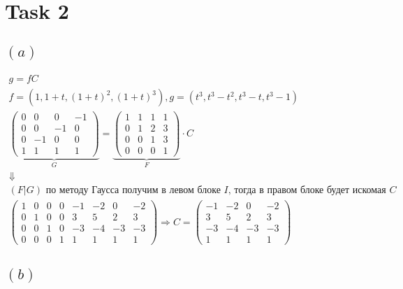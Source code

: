 \section{Task 2}
\subsection{$(a)$}
\begin{gather}
    g = fC \\ f=(1, 1+t,(1+t)^2, (1+t)^3), g = (t^3, t^3-t^2,t^3-t,t^3-1) \\
    \underbrace{\begin{pmatrix}
        0 &  0 &  0 & -1 \\
        0 &  0 & -1 &  0 \\
        0 & -1 &  0 &  0 \\
        1 &  1 &  1 &  1
    \end{pmatrix}}_{G} = 
    \underbrace{
    \begin{pmatrix}
        1 & 1 & 1 & 1 \\
        0 & 1 & 2 & 3 \\
        0 & 0 & 1 & 3 \\
        0 & 0 & 0 & 1
    \end{pmatrix}}_{F}\cdot C \\ \Downarrow \\
    (F|G) \text{ по методу Гаусса получим в левом блоке } I \text{, тогда в правом блоке будет искомая }C \\
    \left(\begin{array}{lccc|rrrr}
        1 & 0 & 0 & 0 & -1 & -2 &  0 & -2 \\
        0 & 1 & 0 & 0 &  3 &  5 &  2 &  3 \\
        0 & 0 & 1 & 0 & -3 & -4 & -3 & -3 \\
        0 & 0 & 0 & 1 &  1 &  1 &  1 &  1
    \end{array}\right)\Longrightarrow 
    C =
    \begin{pmatrix}
        -1 & -2 &  0 & -2 \\
         3 &  5 &  2 &  3 \\
        -3 & -4 & -3 & -3 \\
         1 &  1 &  1 &  1 
    \end{pmatrix}
\end{gather}

\subsection{$(b)$}

